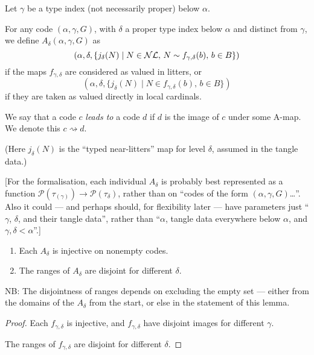 \begin{definition}
\label {def:a-map}
\leanok
Let $\gamma$ be a type index (not necessarily proper) below $\alpha$.

For any code $(\alpha,\gamma,G)$, with $\delta$ a proper type index below $\alpha$ and distinct from $\gamma$, we define
$A_\delta(\alpha,\gamma,G)$ as
$$(\alpha,\delta,\{ j_\delta(N) \mid N \in \mathcal{NL},\, N \sim f_{\gamma,\delta}(b),\, b \in B \})$$
if the maps $f_{\gamma,\delta}$ are considered as valued in litters, or
$$(\alpha,\delta,\{ j_\delta(N) \mid N \in f_{\gamma,\delta}(b),\, b \in B \})$$
if they are taken as valued directly in local cardinals.

We say that a code $c$ \emph{leads to} a code $d$ if $d$ is the image of $c$ under some A-map. We denote this $c \rightsquigarrow d$.

(Here $j_\delta(N)$ is the “typed near-litters” map for level $\delta$, assumed in the tangle data.)

[For the formalisation, each individual $A_\delta$ is probably best represented as a function $\mathcal{P}(\tau_(\gamma)) \to \mathcal{P}(\tau_\delta)$, rather than on “codes of the form $(\alpha,\gamma,G)$…”.  Also it could — and perhaps should, for flexibility later — have parameters just “$\gamma$, $\delta$, and their tangle data”, rather than “$\alpha$, tangle data everywhere below $\alpha$, and $\gamma,\delta < \alpha$”.]
\end{definition}

\begin{lemma}
\label {lem:a-map-properties}
\leanok
\begin{enumerate}
\item Each $A_\delta$ is injective on nonempty codes.
\item The ranges of $A_\delta$ are disjoint for different $\delta$.
\end{enumerate}

NB: The disjointness of ranges depends on excluding the empty set --- either from the domains of the $A_\delta$ from the start, or else in the statement of this lemma.
\end{lemma}
\begin{proof}
\leanok
\item Each $f_{\gamma,\delta}$ is injective, and $f_{\gamma,\delta}$ have disjoint images for different $\gamma$.
\item The ranges of $f_{\gamma,\delta}$ are disjoint for different $\delta$.
\end{proof}

